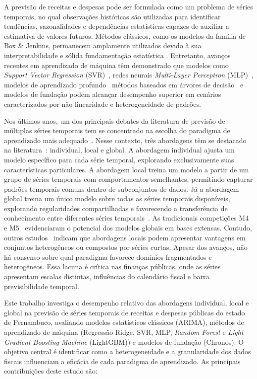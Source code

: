 \documentclass[12pt]{article}
\begin{document}
A previsão de receitas e despesas pode ser formulada como um problema de séries temporais, no qual observações históricas são utilizadas para identificar tendências, sazonalidades e dependências estatísticas capazes de auxiliar a estimativa de valores futuros. Métodos clássicos, como os modelos da família de Box \& Jenkins, permanecem amplamente utilizados devido à sua interpretabilidade e sólida fundamentação estatística \cite{box2008time}. Entretanto, avanços recentes em aprendizado de máquina têm demonstrado que modelos como \textit{Support Vector Regression} (SVR)~\cite{barchi2026genetic}, redes neurais \textit{Multi-Layer Perceptron} (MLP)~\cite{masini2023machine}, modelos de aprendizado profundo~\cite{padilha2025memetic} métodos baseados em árvores de decisão~\cite{petropoulos2022forecasting} e modelos de fundação \cite{ansari2024chronos} podem alcançar desempenho superior em cenários caracterizados por não linearidade e heterogeneidade de padrões.

Nos últimos anos, um dos principais debates da literatura de previsão de múltiplas séries temporais tem se concentrado na escolha do paradigma de aprendizado mais adequado~\cite{makridakis2022m5}. Nesse contexto, três abordagens têm se destacado na literatura~\cite{makridakis2018m4}: individual, local e global. A abordagem individual ajusta um modelo específico para cada série temporal, explorando exclusivamente suas características particulares. A abordagem local treina um modelo a partir de um grupo de séries temporais com comportamentos semelhantes, permitindo capturar padrões temporais comuns dentro de subconjuntos de dados. Já a abordagem global treina um único modelo sobre todas as séries temporais disponíveis, explorando regularidades compartilhadas e favorecendo a transferência de conhecimento entre diferentes séries temporais~\cite{montero2021principles}. As tradicionais competições M4~\cite{makridakis2018m4} e M5~\cite{makridakis2022m5} evidenciaram o potencial dos modelos globais em bases extensas. Contudo, outros estudos~\cite{montero2021principles,bandara2020forecasting,ansari2024chronos} indicam que abordagens locais podem apresentar vantagens em conjuntos heterogêneos ou compostos por séries curtas. Apesar dos avanços, não há consenso sobre qual paradigma favorece domínios fragmentados e heterogêneos. Essa lacuna é crítica nas finanças públicas, onde as séries apresentam escalas distintas, influências do calendário fiscal e baixa previsibilidade temporal.

Este trabalho investiga o desempenho relativo das abordagens individual, local e global na previsão de séries temporais de receitas e despesas públicas do estado de Pernambuco, avaliando modelos estatísticos clássicos (ARIMA), métodos de aprendizado de máquina (Regressão Ridge, SVR, MLP, \emph{Random Forest} e \emph{Light Gradient Boosting Machine} (LightGBM)) e modelos de fundação (Chronos). O objetivo central é identificar como a heterogeneidade e a granularidade dos dados fiscais influenciam a eficácia de cada paradigma de aprendizado. As principais contribuições deste estudo são:
\end{document}
